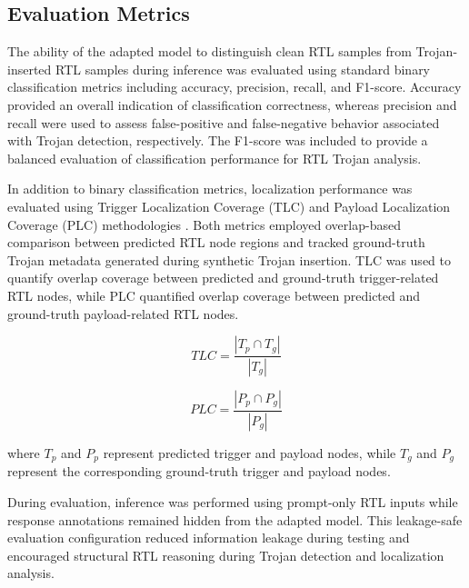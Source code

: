 \documentclass[conference]{IEEEtran}
\begin{document}

\subsection{Evaluation Metrics}
\label{subsec:evaluation_metrics}

The ability of the adapted model to distinguish clean RTL samples from Trojan-inserted RTL samples during inference was evaluated using standard binary classification metrics including accuracy, precision, recall, and F1-score. Accuracy provided an overall indication of classification correctness, whereas precision and recall were used to assess false-positive and false-negative behavior associated with Trojan detection, respectively. The F1-score was included to provide a balanced evaluation of classification performance for RTL Trojan analysis.

In addition to binary classification metrics, localization performance was evaluated using Trigger Localization Coverage (TLC) and Payload Localization Coverage (PLC) methodologies \cite{kundu2025pearl,trojanwhisper}. Both metrics employed overlap-based comparison between predicted RTL node regions and tracked ground-truth Trojan metadata generated during synthetic Trojan insertion. TLC was used to quantify overlap coverage between predicted and ground-truth trigger-related RTL nodes, while PLC quantified overlap coverage between predicted and ground-truth payload-related RTL nodes.

\begin{equation}
TLC = \frac{|T_p \cap T_g|}{|T_g|}
\label{eq:tlc}
\end{equation}

\begin{equation}
PLC = \frac{|P_p \cap P_g|}{|P_g|}
\label{eq:plc}
\end{equation}

where $T_p$ and $P_p$ represent predicted trigger and payload nodes, while $T_g$ and $P_g$ represent the corresponding ground-truth trigger and payload nodes.

During evaluation, inference was performed using prompt-only RTL inputs while response annotations remained hidden from the adapted model. This leakage-safe evaluation configuration reduced information leakage during testing and encouraged structural RTL reasoning during Trojan detection and localization analysis.
\end{document}

